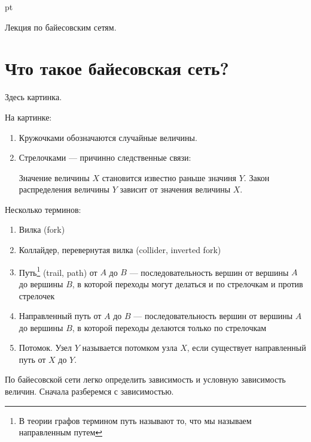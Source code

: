 \documentclass[pdftex,12pt,a4paper]{article}
\begin{document}
 pt %

Лекция по байесовским сетям.

\section{Что такое байесовская сеть?}

Здесь картинка.

На картинке:
\begin{enumerate}
\item Кружочками обозначаются случайные величины.
\item Стрелочками --- причинно следственные связи:


Значение величины $X$ становится известно раньше значиня $Y$. Закон распределения величины $Y$ зависит от значения величины $X$.
\end{enumerate}

Несколько терминов:
\begin{enumerate}
\item Вилка (fork)
\item Коллайдер, перевернутая вилка (collider, inverted fork)
\item Путь\footnote{В теории графов термином путь называют то, что мы называем направленным путем} (trail, path) от $A$ до $B$ --- последовательность вершин от вершины $A$ до вершины $B$, в которой переходы могут делаться и по стрелочкам и против стрелочек
\item Направленный путь от $A$ до $B$ --- последовательность вершин от вершины $A$ до вершины $B$, в которой переходы делаются только по стрелочкам
\item Потомок. Узел $Y$ называется потомком узла $X$, если существует направленный путь от $X$ до $Y$.

\end{enumerate}


По байесовской сети легко определить зависимость и условную зависимость величин. Сначала разберемся с зависимостью.
\end{document}
